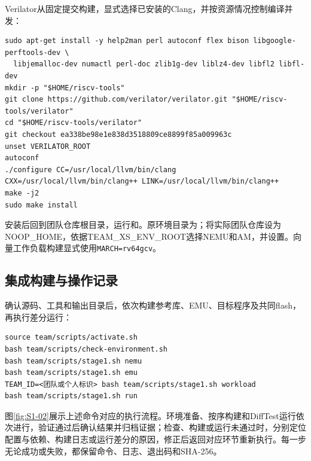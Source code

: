 Verilator从固定提交构建，显式选择已安装的Clang，并按资源情况控制编译并发：
\begin{Verbatim}[breaklines,breakanywhere,breaksymbolleft={},breaksymbolright={},fontsize=\footnotesize,baselinestretch=1]
sudo apt-get install -y help2man perl autoconf flex bison libgoogle-perftools-dev \
  libjemalloc-dev numactl perl-doc zlib1g-dev liblz4-dev libfl2 libfl-dev
mkdir -p "$HOME/riscv-tools"
git clone https://github.com/verilator/verilator.git "$HOME/riscv-tools/verilator"
cd "$HOME/riscv-tools/verilator"
git checkout ea338be98e1e838d3518809ce8899f85a009963c
unset VERILATOR_ROOT
autoconf
./configure CC=/usr/local/llvm/bin/clang CXX=/usr/local/llvm/bin/clang++ LINK=/usr/local/llvm/bin/clang++
make -j2
sudo make install
\end{Verbatim}

安装后回到团队仓库根目录，运行和。原环境目录为；将实际团队仓库设为NOOP\_HOME，依据TEAM\_XS\_ENV\_ROOT选择NEMU和AM，并设置。向量工作负载构建显式使用\Verb|MARCH=rv64gcv|。

\subsection{集成构建与操作记录}

确认源码、工具和输出目录后，依次构建参考库、EMU、目标程序及共同flash，再执行差分运行：
\begin{Verbatim}[breaklines,breakanywhere,breaksymbolleft={},breaksymbolright={},fontsize=\footnotesize,baselinestretch=1]
source team/scripts/activate.sh
bash team/scripts/check-environment.sh
bash team/scripts/stage1.sh nemu
bash team/scripts/stage1.sh emu
TEAM_ID=<团队或个人标识> bash team/scripts/stage1.sh workload
bash team/scripts/stage1.sh run
\end{Verbatim}

图\ref{fig:S1-02}展示上述命令对应的执行流程。环境准备、按序构建和DiffTest运行依次进行，验证通过后确认结果并归档证据；检查、构建或运行未通过时，分别定位配置与依赖、构建日志或运行差分的原因，修正后返回对应环节重新执行。每一步无论成功或失败，都保留命令、日志、退出码和SHA-256。


